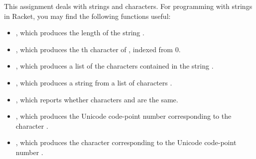 \documentclass{article}
\begin{document}
\noindent
This assignment deals with strings and characters.  For programming with strings
in Racket, you may find the following functions useful:
\begin{itemize}\setlength\itemsep{0pt}

\item {}, which produces the length of the string
  .

\item {}, which produces the th character of
  , indexed from 0.

\item {}, which produces a list of the characters
  contained in the string .

\item {}, which produces a string from a list of
  characters .

\item {}, which reports whether characters  and
   are the same.

\item {}, which produces the Unicode code-point number
  corresponding to the character .

\item {}, which produces the character corresponding to
  the Unicode code-point number .

\end{itemize}
\end{document}
